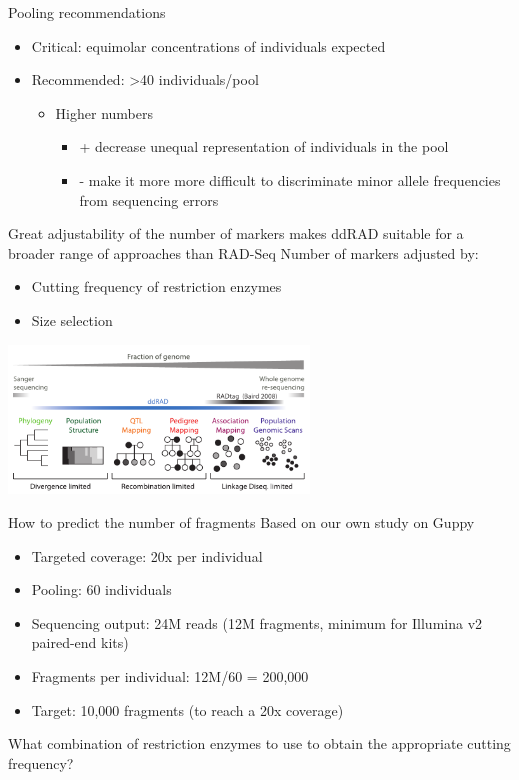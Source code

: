 \documentclass[presentation]{beamer}
\begin{document}
\begin{frame}[label=sec-2-2-4]{Pooling recommendations}
\begin{itemize}
\item Critical: equimolar concentrations of individuals expected
\item Recommended: >40 individuals/pool
\begin{itemize}
\item Higher numbers
\begin{itemize}
\item + decrease unequal representation of individuals in
the pool
\item - make it more more difficult to discriminate minor allele
frequencies from sequencing errors
\end{itemize}
\end{itemize}
\end{itemize}
\end{frame}
\begin{frame}[label=sec-2-2-5]{Great adjustability of the number of markers makes ddRAD suitable for a broader range of approaches than RAD-Seq}
Number of markers adjusted by:
\begin{itemize}
\item Cutting frequency of restriction enzymes
\item Size selection
\end{itemize}
\includegraphics[width=8cm]{Peterson-2012-Fig1.png}   
\begin{center}
\tiny{\citep{Peterson2012}}
\end{center}
\end{frame}
\begin{frame}[label=sec-2-2-6]{How to predict the number of fragments}
Based on our own study on Guppy
\begin{itemize}
\item Targeted coverage: 20x per individual
\item Pooling: 60 individuals
\item Sequencing output: 24M reads (12M fragments, minimum for Illumina v2
paired-end kits)
\item Fragments per individual: 12M/60 = 200,000

\item Target: \alert{10,000} fragments (to reach a 20x coverage)
\end{itemize}

What combination of restriction enzymes to use to obtain the appropriate cutting
frequency?
\end{frame}
\end{document}
